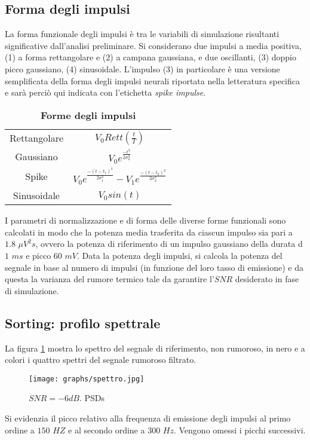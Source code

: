 \documentclass[9pt,twocolumn,twoside]{osajnl}
\begin{document}
\subsection{Forma degli impulsi}

La forma funzionale degli impulsi è tra le variabili di simulazione risultanti significative dall'analisi preliminare.
Si considerano due impulsi a media positiva, (1) a forma rettangolare e (2) a campana gaussiana, e due oscillanti, (3) doppio picco gaussiano, (4) sinusoidale. L'impulso (3) in particolare è una versione semplificata della forma degli impulsi neurali riportata nella letteratura specifica e sarà perciò qui indicata con l'etichetta {\it spike impulse}.

\begin{table}[htbp]
\centering
\caption{\bf Forme degli impulsi}
\begin{tabular}{cc}
\hline
Rettangolare    & $V_{0}Rett(\frac{t}{T})$ \\
Gaussiano       & $V_{0}e^{\frac{-t^{2}}{2\sigma_{0}^{2}}}$ \\
Spike           & $V_{0}e^{\frac{-(t-t_{1})^{2}}{2\sigma_{1}^{2}}} 
                   -V_{1}e^{\frac{-(t-t_{2})^{2}}{2\sigma_{2}^{2}}}$ \\
Sinusoidale       & $V_{0}sin(t)$ \\
\hline
\end{tabular}
\label{tab:forme}
\end{table}

I parametri di normalizzazione e di forma delle diverse forme funzionali sono calcolati in modo che la potenza media trasferita da ciascun impulso sia pari a $1.8$ $\mu V^{2}s$, ovvero la potenza di riferimento di un impulso gaussiano della durata d $1$ $ms$ e picco $60$ $mV$.
Data la potenza degli impulsi, si calcola la potenza del segnale in base al numero di impulsi (in funzione del loro tasso di emissione) e da questa la varianza del rumore termico tale da garantire l'$SNR$ desiderato in fase di simulazione.



\subsection{Sorting: profilo spettrale}

La figura \ref{fig:c9_I5SNR4spec} mostra lo spettro del segnale di riferimento, non rumoroso, in nero e a colori i quattro spettri del segnale rumoroso filtrato.
%
\begin{figure}[htbp]
\centering
\texttt{[image: graphs/spettro.jpg]}
\caption{$SNR = -6dB$. PSDs}
\label{fig:c9_I5SNR4spec}
\end{figure}
%
Si evidenzia il picco relativo alla frequenza di emissione degli impulsi al primo ordine a $150$ $HZ$ e al secondo ordine a $300$ $Hz$. Vengono omessi i picchi successivi. 
\end{document}
